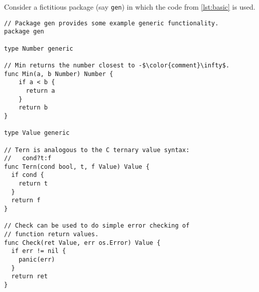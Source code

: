 \documentclass[10pt]{article}
\newcommand{\code}[1]{\texttt{#1}}
\newcommand{\Listing}[1]{\autoref{lst:#1}}
\begin{document}
Consider a fictitious package (say \code{gen}) in which the code from \Listing{basic} is used.
\begin{lstlisting}[float=tbp,caption={Basic example of generic types},label=lst:basic]
// Package gen provides some example generic functionality.
package gen

type Number generic

// Min returns the number closest to -$\color{comment}\infty$.
func Min(a, b Number) Number {
	if a < b {
	  return a
	}
	return b
}

type Value generic

// Tern is analogous to the C ternary value syntax:
//   cond?t:f
func Tern(cond bool, t, f Value) Value {
  if cond {
    return t
  }
  return f
}

// Check can be used to do simple error checking of
// function return values.
func Check(ret Value, err os.Error) Value {
  if err != nil {
    panic(err)
  }
  return ret
}
\end{lstlisting}
\end{document}
